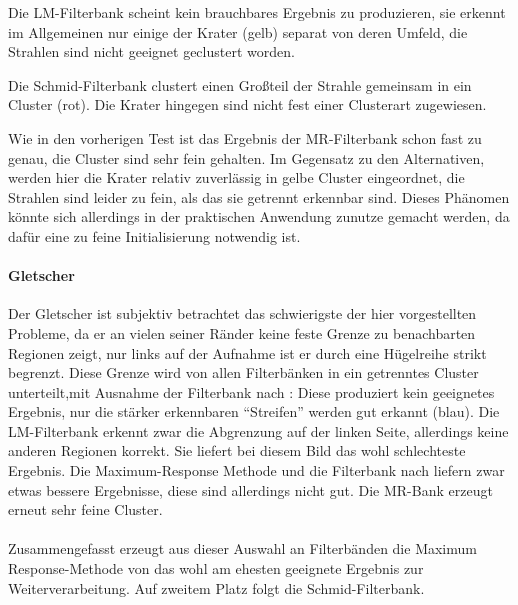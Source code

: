 Die LM-Filterbank scheint kein brauchbares Ergebnis zu produzieren, sie erkennt im Allgemeinen nur einige der Krater (gelb) separat von deren Umfeld, die Strahlen sind nicht geeignet geclustert worden.

Die Schmid-Filterbank clustert einen Großteil der Strahle gemeinsam in ein Cluster (rot). Die Krater hingegen sind nicht fest einer Clusterart zugewiesen.

Wie in den vorherigen Test ist das Ergebnis der MR-Filterbank schon fast zu genau, die Cluster sind sehr fein gehalten. Im Gegensatz zu den Alternativen, werden hier die Krater relativ zuverlässig in gelbe Cluster eingeordnet, die Strahlen sind leider zu fein, als das sie getrennt erkennbar sind. Dieses Phänomen könnte sich allerdings in der praktischen Anwendung zunutze gemacht werden, da dafür eine zu feine Initialisierung notwendig ist.

\paragraph{Gletscher}

Der Gletscher ist subjektiv betrachtet das schwierigste der hier vorgestellten Probleme, da er an vielen seiner Ränder keine feste Grenze zu benachbarten Regionen zeigt, nur links auf der Aufnahme ist er durch eine Hügelreihe strikt begrenzt. Diese Grenze wird von allen Filterbänken in ein getrenntes Cluster unterteilt,mit Ausnahme der Filterbank nach \cite{jain_91}: Diese produziert kein geeignetes Ergebnis, nur die stärker erkennbaren \enquote{Streifen} werden gut erkannt (blau). Die LM-Filterbank erkennt zwar die Abgrenzung auf der linken Seite, allerdings keine anderen Regionen korrekt. Sie liefert bei diesem Bild das wohl schlechteste Ergebnis. Die Maximum-Response Methode und die Filterbank nach \cite{leung_01} liefern zwar etwas bessere Ergebnisse, diese sind allerdings nicht gut. Die MR-Bank erzeugt erneut sehr feine Cluster.

\paragraph{}
Zusammengefasst erzeugt aus dieser Auswahl an Filterbänden die Maximum Response-Methode von \cite{visgeo} das wohl am ehesten geeignete Ergebnis zur Weiterverarbeitung. Auf zweitem Platz folgt die Schmid-Filterbank.

